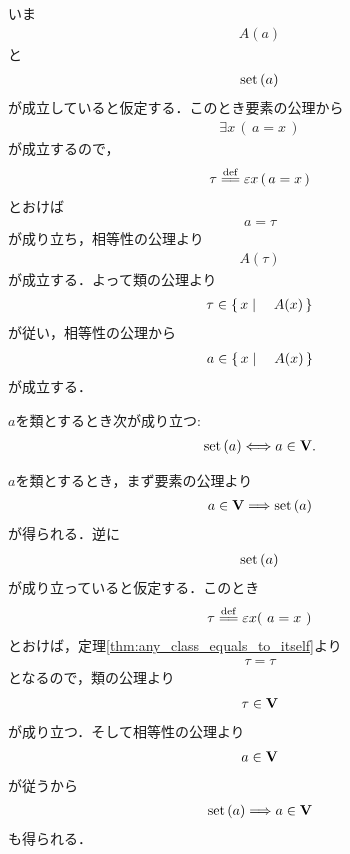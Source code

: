 	\begin{sketch}
		いま
		\begin{align}
			A(a)
		\end{align}
		と
		\begin{align}
			\operatorname*{set} \left(a\right)
		\end{align}
		が成立していると仮定する．このとき要素の公理から
		\begin{align}
			\exists x\, (\, a = x\, )
		\end{align}
		が成立するので，
		\begin{align}
			\tau \defeq \varepsilon x\, (\, a = x\, )
		\end{align}
		とおけば
		\begin{align}
			a = \tau
		\end{align}
		が成り立ち，相等性の公理より
		\begin{align}
			A(\tau)
		\end{align}
		が成立する．よって類の公理より
		\begin{align}
			\tau \in \left\{\, x \mid \quad A(x)\, \right\}
		\end{align}
		が従い，相等性の公理から
		\begin{align}
			a \in \left\{\, x \mid \quad A(x)\, \right\}
		\end{align}
		が成立する．
		\QED
	\end{sketch}
	
	\begin{screen}
		\begin{thm}
		\label{thm:V_is_the_whole_of_sets}
			$a$を類とするとき次が成り立つ:
			\begin{align}
				\operatorname*{set} \left(a\right) \Longleftrightarrow a \in \mathbf{V}.
			\end{align}
		\end{thm}
	\end{screen}
	
	\begin{prf}
		$a$を類とするとき，まず要素の公理より
		\begin{align}
			a \in \mathbf{V} \Longrightarrow \operatorname*{set} \left(a\right)
		\end{align}
		が得られる．逆に
		\begin{align}
			\operatorname*{set} \left(a\right)
		\end{align}
		が成り立っていると仮定する．このとき
		\begin{align}
			\tau \defeq \varepsilon x (\ a = x\ )
		\end{align}
		とおけば，定理\ref{thm:any_class_equals_to_itself}より
		\begin{align}
			\tau = \tau
		\end{align}
		となるので，類の公理より
		\begin{align}
			\tau \in \mathbf{V}
		\end{align}
		が成り立つ．そして相等性の公理より
		\begin{align}
			a \in \mathbf{V}
		\end{align}
		が従うから
		\begin{align}
			\operatorname*{set} \left(a\right) \Longrightarrow a \in \mathbf{V}
		\end{align}
		も得られる．
		\QED
	\end{prf}
	
